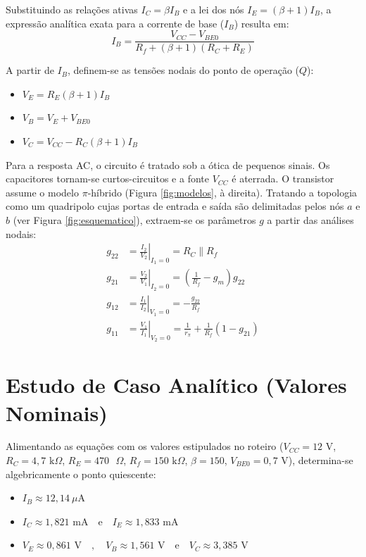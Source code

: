 Substituindo as relações ativas $I_C = \beta I_B$ e a lei dos nós $I_E = (\beta + 1)I_B$, a expressão analítica exata para a corrente de base ($I_B$) resulta em:
\begin{equation}
	I_B = \frac{V_{CC} - V_{BE0}}{R_f + (\beta + 1)(R_C + R_E)}
\end{equation}

A partir de $I_B$, definem-se as tensões nodais do ponto de operação ($Q$):
\begin{itemize}
	\item $V_E = R_E (\beta + 1)I_B$
	\item $V_B = V_E + V_{BE0}$
	\item $V_C = V_{CC} - R_C(\beta + 1)I_B$
\end{itemize}

Para a resposta AC, o circuito é tratado sob a ótica de pequenos sinais. Os capacitores tornam-se curtos-circuitos e a fonte $V_{CC}$ é aterrada. O transistor assume o modelo $\pi$-híbrido (Figura \ref{fig:modelos}, à direita). Tratando a topologia como um quadripolo cujas portas de entrada e saída são delimitadas pelos nós $a$ e $b$ (ver Figura \ref{fig:esquematico}), extraem-se os parâmetros $g$ a partir das análises nodais:
\begin{align}
	g_{22} &= \left. \frac{I_2}{V_2} \right|_{I_1=0} = R_C \parallel R_f \label{eq:g22} \\
	g_{21} &= \left. \frac{V_2}{V_1} \right|_{I_2=0} = \left( \frac{1}{R_f} - g_m \right) g_{22} \\
	g_{12} &= \left. \frac{I_1}{I_2} \right|_{V_1=0} = - \frac{g_{22}}{R_f} \\
	g_{11} &= \left. \frac{V_1}{I_1} \right|_{V_2=0} = \frac{1}{r_\pi} + \frac{1}{R_f}(1 - g_{21})
\end{align}

\section{Estudo de Caso Analítico (Valores Nominais)}

Alimentando as equações com os valores estipulados no roteiro ($V_{CC} = 12\text{ V}$, $R_C = 4,7\text{ k}\Omega$, $R_E = 470\text{ }\Omega$, $R_f = 150\text{ k}\Omega$, $\beta = 150$, $V_{BE0} = 0,7\text{ V}$), determina-se algebricamente o ponto quiescente:
\begin{itemize}
	\item $I_B \approx 12,14\ \mu\text{A}$
	\item $I_C \approx 1,821\text{ mA} \quad \text{e} \quad I_E \approx 1,833\text{ mA}$
	\item $V_E \approx 0,861\text{ V} \quad , \quad V_B \approx 1,561\text{ V} \quad \text{e} \quad V_C \approx 3,385\text{ V}$
\end{itemize}

